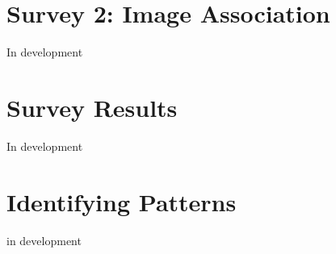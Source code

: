 \documentclass[12pt, usenames, dvipsnames]{report}
\begin{document}
\begin{flushleft}

\section{Survey 2: Image Association}

In development


\section{Survey Results}

In development


\section{Identifying Patterns}

in development





\end{flushleft}
\end{document}
